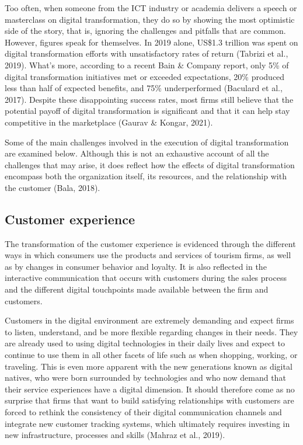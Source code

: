 \documentclass[
  letterpaper,
  DIV=11,
  numbers=noendperiod]{scrreprt}
\begin{document}
Too often, when someone from the ICT industry or academia delivers a
speech or masterclass on digital transformation, they do so by showing
the most optimistic side of the story, that is, ignoring the challenges
and pitfalls that are common. However, figures speak for themselves. In
2019 alone, US\$1.3 trillion was spent on digital transformation efforts
with unsatisfactory rates of return (Tabrizi et al., 2019). What's more,
according to a recent Bain \& Company report, only 5\% of digital
transformation initiatives met or exceeded expectations, 20\% produced
less than half of expected benefits, and 75\% underperformed (Baculard
et al., 2017). Despite these disappointing success rates, most firms
still believe that the potential payoff of digital transformation is
significant and that it can help stay competitive in the marketplace
(Gaurav \& Kongar, 2021).

Some of the main challenges involved in the execution of digital
transformation are examined below. Although this is not an exhaustive
account of all the challenges that may arise, it does reflect how the
effects of digital transformation encompass both the organization
itself, its resources, and the relationship with the customer (Bala,
2018).

\hypertarget{customer-experience}{%
\subsection{Customer experience}\label{customer-experience}}

The transformation of the customer experience is evidenced through the
different ways in which consumers use the products and services of
tourism firms, as well as by changes in consumer behavior and loyalty.
It is also reflected in the interactive communication that occurs with
customers during the sales process and the different digital touchpoints
made available between the firm and customers.

Customers in the digital environment are extremely demanding and expect
firms to listen, understand, and be more flexible regarding changes in
their needs. They are already used to using digital technologies in
their daily lives and expect to continue to use them in all other facets
of life such as when shopping, working, or traveling. This is even more
apparent with the new generations known as digital natives, who were
born surrounded by technologies and who now demand that their service
experiences have a digital dimension. It should therefore come as no
surprise that firms that want to build satisfying relationships with
customers are forced to rethink the consistency of their digital
communication channels and integrate new customer tracking systems,
which ultimately requires investing in new infrastructure, processes and
skills (Mahraz et al., 2019).
\end{document}
